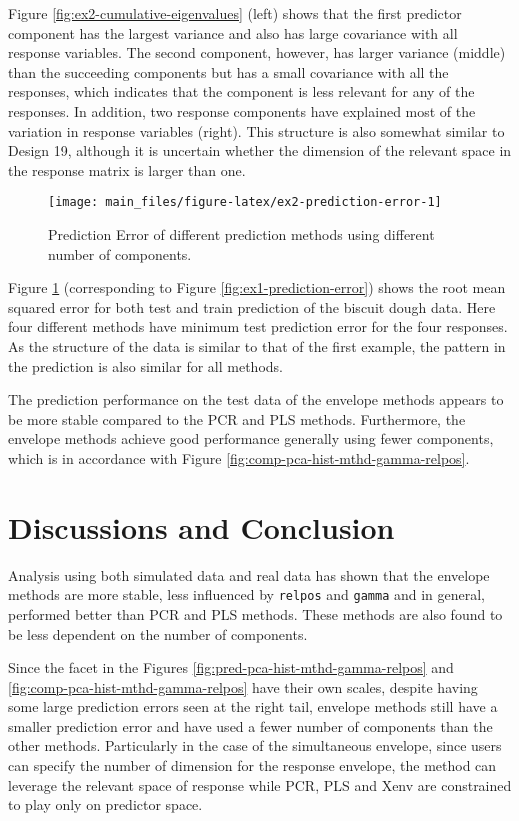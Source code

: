\documentclass[review]{elsarticle}
\begin{document}
Figure \ref{fig:ex2-cumulative-eigenvalues} (left) shows that the first predictor component has the largest variance and also has large covariance with all response variables. The second component, however, has larger variance (middle) than the succeeding components but has a small covariance with all the responses, which indicates that the component is less relevant for any of the responses. In addition, two response components have explained most of the variation in response variables (right). This structure is also somewhat similar to Design 19, although it is uncertain whether the dimension of the relevant space in the response matrix is larger than one.

\begin{figure}[!htb]
\texttt{[image: main\_files/figure-latex/ex2-prediction-error-1]} \caption{Prediction Error of different prediction methods using different number of components.}\label{fig:ex2-prediction-error}
\end{figure}

Figure \ref{fig:ex2-prediction-error} (corresponding to Figure \ref{fig:ex1-prediction-error}) shows the root mean squared error for both test and train prediction of the biscuit dough data. Here four different methods have minimum test prediction error for the four responses. As the structure of the data is similar to that of the first example, the pattern in the prediction is also similar for all methods.

The prediction performance on the test data of the envelope methods appears to be more stable compared to the PCR and PLS methods. Furthermore, the envelope methods achieve good performance generally using fewer components, which is in accordance with Figure \ref{fig:comp-pca-hist-mthd-gamma-relpos}.

\hypertarget{discussions-and-conclusion}{%
\section{Discussions and Conclusion}\label{discussions-and-conclusion}}

Analysis using both simulated data and real data has shown that the envelope methods are more stable, less influenced by \texttt{relpos} and \texttt{gamma} and in general, performed better than PCR and PLS methods. These methods are also found to be less dependent on the number of components.

Since the facet in the Figures \ref{fig:pred-pca-hist-mthd-gamma-relpos} and \ref{fig:comp-pca-hist-mthd-gamma-relpos} have their own scales, despite having some large prediction errors seen at the right tail, envelope methods still have a smaller prediction error and have used a fewer number of components than the other methods. Particularly in the case of the simultaneous envelope, since users can specify the number of dimension for the response envelope, the method can leverage the relevant space of response while PCR, PLS and Xenv are constrained to play only on predictor space.
\end{document}
